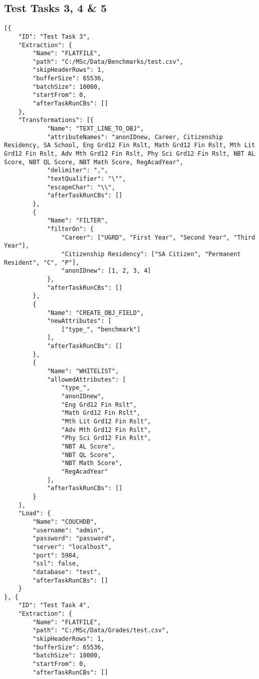 \subsection{Test Tasks 3, 4 \& 5}
\label{netl-tasks-test-2}
\begin{verbatim}
[{
    "ID": "Test Task 3",
    "Extraction": {
        "Name": "FLATFILE",
        "path": "C:/MSc/Data/Benchmarks/test.csv",
        "skipHeaderRows": 1,
        "bufferSize": 65536,
        "batchSize": 10000,
        "startFrom": 0,
        "afterTaskRunCBs": []
    },
    "Transformations": [{
            "Name": "TEXT_LINE_TO_OBJ",
            "attributeNames": "anonIDnew, Career, Citizenship Residency, SA School, Eng Grd12 Fin Rslt, Math Grd12 Fin Rslt, Mth Lit Grd12 Fin Rslt, Adv Mth Grd12 Fin Rslt, Phy Sci Grd12 Fin Rslt, NBT AL Score, NBT QL Score, NBT Math Score, RegAcadYear",
            "delimiter": ",",
            "textQualifier": "\"",
            "escapeChar": "\\",
            "afterTaskRunCBs": []
        },
        {
            "Name": "FILTER",
            "filterOn": {
                "Career": ["UGRD", "First Year", "Second Year", "Third Year"],
                "Citizenship Residency": ["SA Citizen", "Permanent Resident", "C", "P"],
                "anonIDnew": [1, 2, 3, 4]
            },
            "afterTaskRunCBs": []
        },
        {
            "Name": "CREATE_OBJ_FIELD",
            "newAttributes": [
                ["type_", "benchmark"]
            ],
            "afterTaskRunCBs": []
        },
        {
            "Name": "WHITELIST",
            "allowedAttributes": [
                "type_",
                "anonIDnew",
                "Eng Grd12 Fin Rslt",
                "Math Grd12 Fin Rslt",
                "Mth Lit Grd12 Fin Rslt",
                "Adv Mth Grd12 Fin Rslt",
                "Phy Sci Grd12 Fin Rslt",
                "NBT AL Score",
                "NBT QL Score",
                "NBT Math Score",
                "RegAcadYear"
            ],
            "afterTaskRunCBs": []
        }
    ],
    "Load": {
        "Name": "COUCHDB",
        "username": "admin",
        "password": "password",
        "server": "localhost",
        "port": 5984,
        "ssl": false,
        "database": "test",
        "afterTaskRunCBs": []
    }
}, {
    "ID": "Test Task 4",
    "Extraction": {
        "Name": "FLATFILE",
        "path": "C:/MSc/Data/Grades/test.csv",
        "skipHeaderRows": 1,
        "bufferSize": 65536,
        "batchSize": 10000,
        "startFrom": 0,
        "afterTaskRunCBs": []

\end{verbatim}
